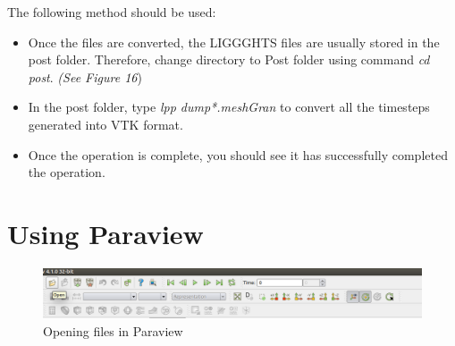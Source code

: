 \documentclass{tufte-book} %
\begin{document}
 The following method should be used:
 \begin{itemize}
 \item Once the files are converted, the LIGGGHTS files are usually stored in the post folder. Therefore, change directory to Post folder using command \textit{\emph{cd post}}. \textit{(See Figure 16})
 \item In the post folder, type \textit{\emph{lpp dump*.meshGran }} to convert all the timesteps generated into VTK format.
 \item Once the operation is complete, you should see it has successfully completed the operation.
 \end{itemize}

 


 \section[Using Paraview]{Using Paraview }
\begin{figure}
  \includegraphics[width=\linewidth]{graphics/Screenshot/P1.png}
  \caption{Opening files in Paraview}
  \end{figure}
\end{document}
